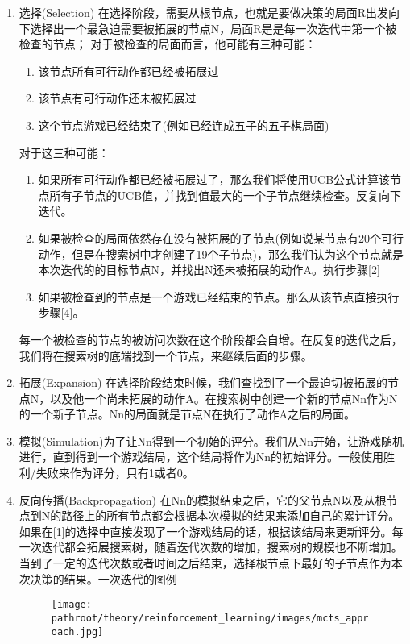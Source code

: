 \documentclass[10pt,a4paper]{ctexbook}
\providecommand{\pathroot}{../..}
\begin{document}
\begin{enumerate}
\item 选择(Selection)
在选择阶段，需要从根节点，也就是要做决策的局面R出发向下选择出一个最急迫需要被拓展的节点N，局面R是是每一次迭代中第一个被检查的节点；
对于被检查的局面而言，他可能有三种可能：
    \begin{enumerate}
    \item 该节点所有可行动作都已经被拓展过
    \item 该节点有可行动作还未被拓展过
    \item 这个节点游戏已经结束了(例如已经连成五子的五子棋局面)
    \end{enumerate}

对于这三种可能：
    \begin{enumerate}
    \item 如果所有可行动作都已经被拓展过了，那么我们将使用UCB公式计算该节点所有子节点的UCB值，并找到值最大的一个子节点继续检查。反复向下迭代。
    \item 如果被检查的局面依然存在没有被拓展的子节点(例如说某节点有20个可行动作，但是在搜索树中才创建了19个子节点)，那么我们认为这个节点就是本次迭代的的目标节点N，并找出N还未被拓展的动作A。执行步骤[2]
    \item 如果被检查到的节点是一个游戏已经结束的节点。那么从该节点直接执行步骤[4]。
    \end{enumerate}
每一个被检查的节点的被访问次数在这个阶段都会自增。在反复的迭代之后，我们将在搜索树的底端找到一个节点，来继续后面的步骤。

\item 拓展(Expansion)
在选择阶段结束时候，我们查找到了一个最迫切被拓展的节点N，以及他一个尚未拓展的动作A。在搜索树中创建一个新的节点Nn作为N的一个新子节点。Nn的局面就是节点N在执行了动作A之后的局面。

\item 模拟(Simulation)为了让Nn得到一个初始的评分。我们从Nn开始，让游戏随机进行，直到得到一个游戏结局，这个结局将作为Nn的初始评分。一般使用胜利/失败来作为评分，只有1或者0。

\item 反向传播(Backpropagation)
在Nn的模拟结束之后，它的父节点N以及从根节点到N的路径上的所有节点都会根据本次模拟的结果来添加自己的累计评分。如果在[1]的选择中直接发现了一个游戏结局的话，根据该结局来更新评分。每一次迭代都会拓展搜索树，随着迭代次数的增加，搜索树的规模也不断增加。当到了一定的迭代次数或者时间之后结束，选择根节点下最好的子节点作为本次决策的结果。一次迭代的图例
\begin{figure}[ht]
    \centering
    \texttt{[image: \\pathroot/theory/reinforcement\_learning/images/mcts\_approach.jpg]}
    \label{fig:mcts_approach}
\end{figure}



\end{enumerate}
\end{document}

